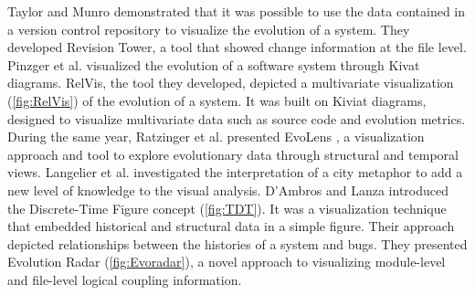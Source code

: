 Taylor and Munro \cite{Taylor2002} demonstrated that it was possible to use the data contained in a version control repository to visualize the evolution of a system.
They developed Revision Tower, a tool that showed change information at the file level. 
Pinzger et al. \cite{Pinzger2005} visualized the evolution of a software system through Kivat diagrams.
RelVis, the tool they developed, depicted a multivariate visualization (\autoref{fig:RelVis}) of the evolution of a system. It was built on Kiviat diagrams, designed to visualize multivariate data such as source code and evolution metrics. 
During the same year, Ratzinger et al. presented EvoLens \cite{Ratzinger2005}, a visualization approach and tool to 
explore evolutionary data through structural and temporal views.
Langelier et al. \cite{Langelier2005} investigated the interpretation of a city metaphor 
\cite{Knight2000} to add a new level of knowledge to the visual analysis.
D’Ambros and Lanza \cite{DAmbros2006} introduced the Discrete-Time Figure concept (\autoref{fig:TDT}). It was a visualization technique that embedded historical and structural data in a simple figure. 
Their approach depicted relationships between the histories of a system and bugs. 
They presented Evolution Radar \cite{DAmbros2006a} (\autoref{fig:Evoradar}), a novel approach to visualizing module-level and file-level logical coupling information.

